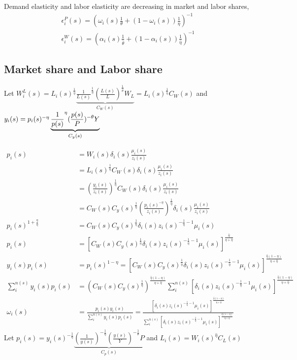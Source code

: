 Demand elasticity and labor elasticity are decreasing in market and labor shares,\\
\begin{align}
    \epsilon_i^P(s) = (\omega_i(s)\frac{1}{\theta} + (1-\omega_i(s))\frac{1}{\eta})^{-1}\\
    \epsilon^W_i(s) =  (\alpha_i(s)\frac{1}{\hat{\theta}} + (1-\alpha_i(s))\frac{1}{\hat{\eta}})^{-1}
\end{align}

\subsection{Market share and Labor share}

Let $W^L_i(s) = L_i(s)^{\frac{1}{\hat{\eta}}}\underbrace{\frac{1}{L(s)}^{\frac{1}{\hat{\eta}}}(\frac{L(s)}{L})^{\frac{1}{\hat{\theta}}} W_L}_{C_W(s)} = L_i(s)^{\frac{1}{\hat{\eta}}} C_W(s)$ and $y_i(s) = p_i(s)^{-\eta}\underbrace{\frac{1}{p(s)}^{\eta}(\frac{p(s)}{P})^{-\theta}Y}_{C_y(s)}\\$

\begin{align}
    p_i(s) &= W_i(s)\delta_i(s)\frac{\mu_i(s)}{z_i(s)}\\
    &= L_i(s)^{\frac{1}{\hat{\eta}}} C_W(s)\delta_i(s)\frac{\mu_i(s)}{z_i(s)}\\
    &= (\frac{y_i(s)}{z_i(s)})^{\frac{1}{\hat{\eta}}} C_W(s)\delta_i(s)\frac{\mu_i(s)}{z_i(s)}\\
    &= C_W(s) C_y(s)^{\frac{1}{\hat{\eta}}} (\frac{p_i(s)^{-\eta}}{z_i(s)})^{\frac{1}{\hat{\eta}}} \delta_i(s)\frac{\mu_i(s)}{z_i(s)}\\
    p_i(s)^{1+\frac{\eta}{ \hat{\eta}}} &=  C_W(s) C_y(s)^{\frac{1}{\hat{\eta}}} \delta_i(s)z_i(s)^{-\frac{1}{ \hat{\eta}}-1}\mu_i(s)\\
    p_i(s) &=  [C_W(s) C_y(s)^{\frac{1}{\hat{\eta}}} \delta_i(s)z_i(s)^{-\frac{1}{ \hat{\eta}}-1}\mu_i(s)]^{\frac{ \hat{\eta}}{\eta+\hat{\eta}}}\\
    y_i(s)p_i(s) &= p_i(s)^{1-\eta} = [C_W(s) C_y(s)^{\frac{1}{\hat{\eta}}} \delta_i(s)z_i(s)^{-\frac{1}{ \hat{\eta}}-1}\mu_i(s)]^{\frac{\hat{\eta}(1-\eta)}{\eta+\hat{\eta}}}\\
    \sum_i^{n(s)} y_i(s) p_i(s) &= (C_W(s) C_y(s)^{\frac{1}{\hat{\eta}}})^{\frac{\hat{\eta}(1-\eta)}{\eta+\hat{\eta}}}\sum_i^{n(s)} [\delta_i(s)z_i(s)^{-\frac{1}{ \hat{\eta}}-1}\mu_i(s)]^{\frac{\hat{\eta}(1-\eta)}{\eta+\hat{\eta}}}\\
    \omega_i(s) &= \frac{p_i(s) y_i(s)}{\sum_i^{n(s)} y_i(s) p_i(s)} =  \frac{[\delta_i(s)z_i(s)^{-\frac{1}{ \hat{\eta}}-1}\mu_i(s)]^{\frac{\hat{\eta}(1-\eta)}{\eta+\hat{\eta}}}}{\sum_i^{n(s)} [\delta_i(s)z_i(s)^{-\frac{1}{ \hat{\eta}}-1}\mu_i(s)]^{\frac{\hat{\eta}(1-\eta)}{\eta+\hat{\eta}}}}
\end{align}
\newpage
Let $p_i(s) = y_i(s)^{-\frac{1}{\eta}}\underbrace{(\frac{1}{y(s)})^{-\frac{1}{\eta}}(\frac{y(s)}{Y})^{-\frac{1}{\theta}}P}_{C_p(s)}$ and $L_i(s) = W_i(s)^{\hat{\eta}} C_L(s)$

